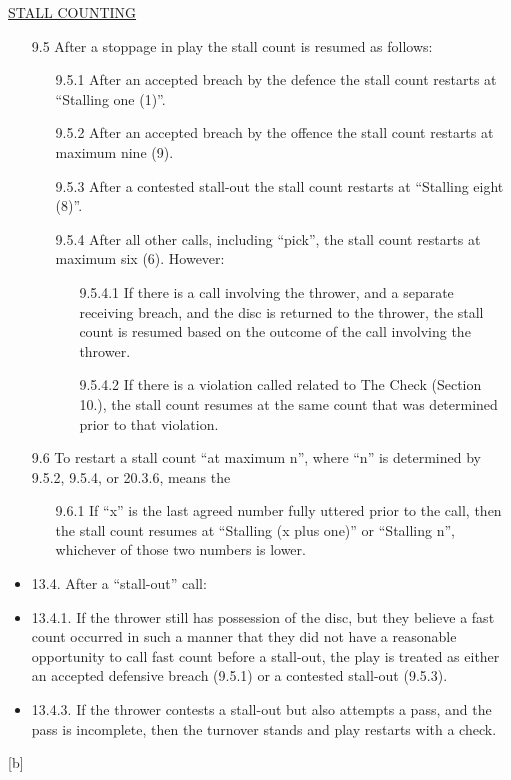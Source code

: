 \underline{\uppercase{stall counting}}
\begin{itemize}
    \item[9.5] After a stoppage in play the stall count is resumed as follows:
        \begin{itemize}
            \item[9.5.1] After an accepted breach by the defence the stall count restarts at “Stalling one (1)”.
            \item[9.5.2] After an accepted breach by the offence the stall count restarts at maximum nine (9).
            \item[9.5.3] After a contested stall-out the stall count restarts at “Stalling eight (8)”.
            \item[9.5.4] After all other calls, including “pick”, the stall count restarts at maximum six (6). However:
                \begin{itemize}
                    \item[9.5.4.1] If there is a call involving the thrower, and a separate receiving breach, and the disc is returned to the thrower, the stall count is resumed based on the outcome of the call involving the thrower.
                    \item[9.5.4.2] If there is a violation called related to The Check (Section 10.), the stall count resumes at the same count that was determined prior to that violation.
                \end{itemize}
        \end{itemize}
            \item[9.6] To restart a stall count “at maximum n”, where “n” is determined by 9.5.2, 9.5.4, or 20.3.6, means the
                \begin{itemize}
                    \item[9.6.1] If “x” is the last agreed number fully uttered prior to the call, then the stall count resumes at “Stalling (x plus one)” or “Stalling n”, whichever of those two numbers is lower.
                \end{itemize}

            \item 13.4. After a “stall-out” call:
            \item 13.4.1. If the thrower still has possession of the disc, but they believe a fast count occurred in such a manner that they did not have a reasonable opportunity to call fast count before a stall-out, the play is treated as either an accepted defensive breach (9.5.1) or a contested stall-out (9.5.3).
            \item 13.4.3. If the thrower contests a stall-out but also attempts a pass, and the pass is incomplete, then the turnover stands and play restarts with a check.
\end{itemize}
\begin{center}[b]\end{center}

